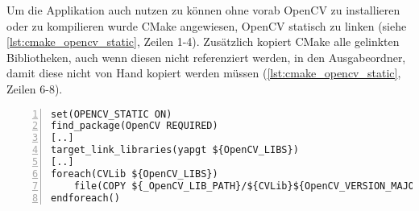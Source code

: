 Um die Applikation auch nutzen zu können ohne vorab OpenCV zu installieren oder zu kompilieren wurde CMake angewiesen, OpenCV statisch zu linken (siehe \autoref{lst:cmake_opencv_static}, Zeilen 1-4).
Zusätzlich kopiert CMake alle gelinkten Bibliotheken, auch wenn diesen nicht referenziert werden, in den Ausgabeordner, damit diese nicht von Hand kopiert werden müssen (\autoref{lst:cmake_opencv_static}, Zeilen 6-8).

\begin{lstlisting}[numbers=left, breaklines=true,breakatwhitespace=false,label=lst:cmake_opencv_static, caption=Ausschnitt von CMakeLists.txt um OpenCV statisch zu linken]
set(OPENCV_STATIC ON)
find_package(OpenCV REQUIRED)
[..]
target_link_libraries(yapgt ${OpenCV_LIBS})
[..]
foreach(CVLib ${OpenCV_LIBS})
    file(COPY ${_OpenCV_LIB_PATH}/${CVLib}${OpenCV_VERSION_MAJOR}${OpenCV_VERSION_MINOR}${OpenCV_VERSION_PATCH}d.dll DESTINATION ${CMAKE_BINARY_DIR})
endforeach()
\end{lstlisting}
